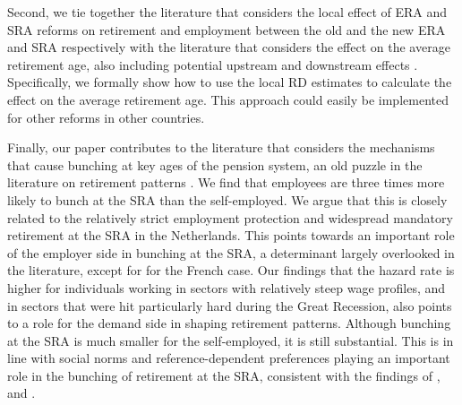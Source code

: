 \documentclass[12pt,a4paper]{article}
\begin{document}
Second, we tie together the literature that considers the local effect of ERA and SRA reforms on retirement and employment between the old and the new ERA and SRA respectively \citep{staubli_does_2013,atalay_impact_2015,cribb2016signals,rabate_employment_2019,geyer_closing_2021} with the literature that considers the effect on the average retirement age, also including potential upstream and downstream effects  \citep{mastrobuoni_labor_2009,manoli_effects_2018,lalive2019raising}. Specifically, we formally show how to use the local RD estimates to calculate the effect on the average retirement age. This approach could easily be implemented for other reforms in other countries. 

Finally, our paper contributes to the literature that considers the mechanisms that cause bunching at key ages of the pension system, an old puzzle in the literature on retirement patterns \citep{lumsdaine1996retirement}. 
We find that employees are three times more likely to bunch at the SRA than the self-employed. We argue that this is closely related to the relatively strict employment protection and widespread mandatory retirement at the SRA in the Netherlands. 
This points towards an important role of the employer side in bunching at the SRA, a determinant largely overlooked in the literature, except for \cite{rabate2019can} for the French case. Our findings that the hazard rate is higher for individuals working in sectors with relatively steep wage profiles, and in sectors that were hit particularly hard during the Great Recession, also points to a role for the demand side in shaping retirement patterns. Although bunching at the SRA is much smaller for the self-employed, it is still substantial. This is in line with social norms and reference-dependent preferences playing an important role in the bunching of retirement at the SRA, consistent with the findings of \cite{behaghel_framing_2012}, \cite{lalive2019raising} and \cite{seibold2019reference}. 
\end{document}
